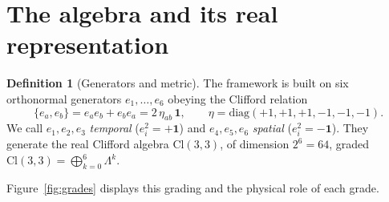 \documentclass[11pt,oneside]{book}
\newcommand{\Cl}{\mathrm{Cl}}                     %
\theoremstyle{plain}
\theoremstyle{definition}
\newtheorem{definition}[theorem]{Definition}
\theoremstyle{remark}
\begin{document}
\section{The algebra and its real representation}
\label{sec:alg-rep}

\begin{definition}[Generators and metric]
\label{def:generators}
The framework is built on six orthonormal generators $e_1,\dots,e_6$ obeying the
Clifford relation
\[
  \{e_a,e_b\}=e_ae_b+e_be_a=2\,\eta_{ab}\,\mathbf 1,
  \qquad
  \eta=\mathrm{diag}(+1,+1,+1,-1,-1,-1).
\]
We call $e_1,e_2,e_3$ \emph{temporal} ($e_i^2=+\mathbf 1$) and $e_4,e_5,e_6$
\emph{spatial} ($e_i^2=-\mathbf 1$). They generate the real Clifford algebra
$\Cl(3,3)$, of dimension $2^6=64$, graded $\Cl(3,3)=\bigoplus_{k=0}^{6}\Lambda^k$.
\end{definition}

Figure~\ref{fig:grades} displays this grading and the physical role of each grade.
\end{document}
